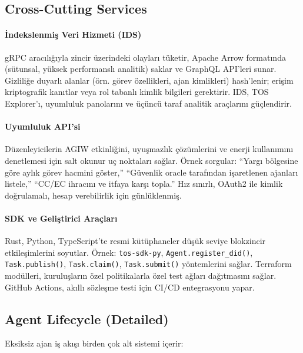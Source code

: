 \documentclass[11pt]{article}
\begin{document}
\subsection{Cross-Cutting Services}
\paragraph{İndekslenmiş Veri Hizmeti (IDS)} gRPC aracılığıyla zincir üzerindeki olayları tüketir, Apache Arrow formatında (sütunsal, yüksek performanslı analitik) saklar ve GraphQL API'leri sunar. Gizliliğe duyarlı alanlar (örn. görev özellikleri, ajan kimlikleri) hash'lenir; erişim kriptografik kanıtlar veya rol tabanlı kimlik bilgileri gerektirir. IDS, TOS Explorer'ı, uyumluluk panolarını ve üçüncü taraf analitik araçlarını güçlendirir.

\paragraph{Uyumluluk API'si} Düzenleyicilerin AGIW etkinliğini, uyuşmazlık çözümlerini ve enerji kullanımını denetlemesi için salt okunur uç noktaları sağlar. Örnek sorgular: ``Yargı bölgesine göre aylık görev hacmini göster,'' ``Güvenlik oracle tarafından işaretlenen ajanları listele,'' ``CC/EC ihracını ve itfaya karşı topla.'' Hız sınırlı, OAuth2 ile kimlik doğrulamalı, hesap verebilirlik için günlüklenmiş.

\paragraph{SDK ve Geliştirici Araçları} Rust, Python, TypeScript'te resmi kütüphaneler düşük seviye blokzincir etkileşimlerini soyutlar. Örnek: \texttt{tos-sdk-py}, \texttt{Agent.register\_did()}, \texttt{Task.publish()}, \texttt{Task.claim()}, \texttt{Task.submit()} yöntemlerini sağlar. Terraform modülleri, kuruluşların özel politikalarla özel test ağları dağıtmasını sağlar. GitHub Actions, akıllı sözleşme testi için CI/CD entegrasyonu yapar.

\subsection{Agent Lifecycle (Detailed)}
Eksiksiz ajan iş akışı birden çok alt sistemi içerir:
\end{document}
